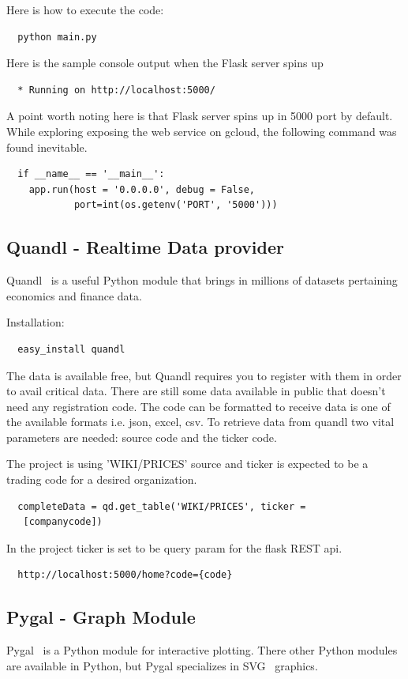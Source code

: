 Here is how to execute the code:
\begin{verbatim}
  python main.py
\end{verbatim}

Here is the sample console output when the Flask server spins up

\begin{verbatim}
  * Running on http://localhost:5000/
\end{verbatim}
A point worth noting here is that Flask server spins up in 5000 port by
default. While exploring exposing the web service on gcloud, the following
command was found inevitable.

\begin{verbatim}
  if __name__ == '__main__':
    app.run(host = '0.0.0.0', debug = False, 
            port=int(os.getenv('PORT', '5000')))
\end{verbatim}

\subsection{Quandl - Realtime Data provider}
Quandl~\cite{hid-sp18-417-Quandl} is a useful Python module that brings in
millions of datasets pertaining economics and finance data. 

Installation:

\begin{verbatim}
  easy_install quandl
\end{verbatim}
The data is available free, but Quandl requires you to register with them in
order to avail critical data. There are still some data available in public
that doesn’t need any registration code. The code can be formatted to receive
data is one of the available formats i.e. json, excel, csv. To retrieve data
from quandl two vital parameters are needed: source code and the ticker code.

The project is using 'WIKI/PRICES' source and ticker is expected to be a
trading code for a desired organization.
\begin{verbatim}
  completeData = qd.get_table('WIKI/PRICES', ticker =
   [companycode])
\end{verbatim}

In the project ticker is set to be query param for the flask REST api.
\begin{verbatim}
  http://localhost:5000/home?code={code}
\end{verbatim}
\subsection{Pygal - Graph Module}
Pygal~\cite{hid-sp18-417-Pygal} is a Python module for interactive plotting.
There other Python modules are available in Python, but Pygal specializes in
SVG~\cite{hid-sp18-417-SVG} graphics.

